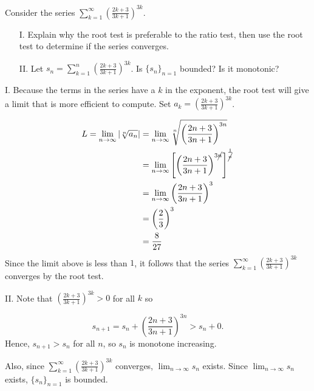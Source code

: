 \documentclass[noauthor,handout]{ximera}
\begin{document}
\begin{problem}
Consider the series $\sum_{k=1}^\infty \left(\frac{2k+3}{3k+1}\right)^{3k}$.  

\begin{itemize}
\item[I.] Explain why the root test is preferable to the ratio test, then use the root test to determine if the series converges.
\item[II.] Let $s_n = \sum_{k=1}^n \left(\frac{2k+3}{3k+1}\right)^{3k}$.  Is $\{s_n\}_{n=1}$ bounded?  Is it monotonic?
\end{itemize}

\begin{freeResponse}

I. Because the terms in the series have a $k$ in the exponent, the root test will give a limit that is more efficient to compute.  Set $a_k = \left(\frac{2k+3}{3k+1}\right)^{3k}$.

\begin{align*}
L = \lim_{n \rightarrow \infty} \left|\sqrt[n]{a_n} \right| &= \lim_{n \rightarrow \infty}\sqrt[n]{\left(\frac{2n+3}{3n+1}\right)^{3n}} \\
&= \lim_{n \rightarrow \infty} \left[\left(\frac{2n+3}{3n+1}\right)^{3\cancel{n}}\right]^{\frac{1}{\cancel{n}}} \\
&= \lim_{n \rightarrow \infty} \left(\frac{2n+3}{3n+1}\right)^3 \\
& = \left(\frac{2}{3}\right)^3 \\
&= \frac{8}{27}
\end{align*}
Since the limit above is less than $1$, it follows that the series $\sum_{k=1}^\infty \left(\frac{2k+3}{3k+1}\right)^{3k}$ converges by the root test.

II. Note that $\left(\frac{2k+3}{3k+1}\right)^{3k}>0$ for all $k$ so

\[
s_{n+1} = s_n + \left(\frac{2n+3}{3n+1}\right)^{3n} >s_n+0.
\]
Hence, $s_{n+1}>s_n$ for all $n$, so $s_n$ is monotone increasing.

Also, since $\sum_{k=1}^\infty \left(\frac{2k+3}{3k+1}\right)^{3k}$ converges, $\lim_{n \to \infty} s_n$ exists.  Since $\lim_{n \to \infty} s_n$ exists, $\{s_n\}_{n=1}$ is bounded.
\end{freeResponse}
\end{problem}
\end{document}
